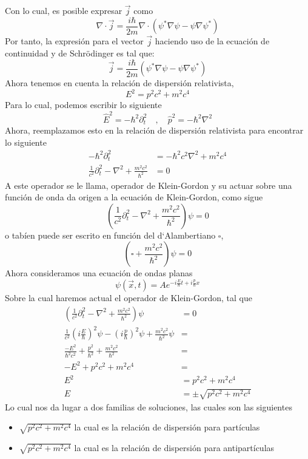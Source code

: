 \documentclass[../main_ej.tex]{subfiles}
\begin{document}
Con lo cual, es posible expresar $\vec{j}$ como 
\begin{equation*}
  \nabla \cdot \vec{j} = \frac{i\hbar}{2m} \nabla \cdot \left( \psi^*\nabla \psi - \psi \nabla \psi^* \right)
\end{equation*}
Por tanto, la expresión para el vector $\vec{j}$ haciendo uso de la ecuación de continuidad y de Schrödinger es tal que:
\begin{equation}
  \vec{j} = \frac{i\hbar}{2m}\left( \psi^*\nabla \psi - \psi\nabla \psi^* \right)
\end{equation}
Ahora tenemos en cuenta la relación de dispersión relativista, 
\begin{equation}
  E^2=p^2c^2+m^2c^4
\end{equation}
Para lo cual, podemos escribir lo siguiente
\begin{equation*}
  \hat{E}^2 = -\hbar^2\partial^2_t \quad , \quad \hat{p}^2 = -\hbar^2\nabla^2
\end{equation*}
Ahora, reemplazamos esto en la relación de dispersión relativista para encontrar lo siguiente
\begin{align*}
  -\hbar^2\partial^2_t & = -\hbar^2c^2\nabla^2 + m^2c^4 \\
  \frac{1}{c^2}\partial^2_t-\nabla^2 + \frac{m^2c^2}{\hbar^2} & = 0
\end{align*}
A este operador se le llama, operador de Klein-Gordon y su actuar sobre una función de onda da origen a la ecuación de Klein-Gordon, como sigue
\begin{equation}
  \left(\frac{1}{c^2}\partial^2_t-\nabla^2+\frac{m^2c^2}{\hbar^2}\right)\psi = 0
\end{equation}
o tabíen puede ser escrito en función del d`Alambertiano $\square$,
\begin{equation}
  \left(\square + \frac{m^2c^2}{\hbar^2}\right)\psi = 0
\end{equation}
Ahora consideramos una ecuación de ondas planas
\begin{equation*}
  \psi(\vec{x},t)=Ae^{-i\frac{E}{\hbar}t+i\frac{p}{\hbar}x}
\end{equation*}
Sobre la cual haremos actual el operador de Klein-Gordon, tal que
\begin{align*}
  \left(\frac{1}{c^2}\partial^2_t-\nabla^2+\frac{m^2c^2}{\hbar^2}\right)\psi  & = 0 \\
  \frac{1}{c^2}\left(i\frac{E}{\hbar}\right)^2\psi - \left(i\frac{p}{\hbar}\right)^2\psi + \frac{m^2c^2}{\hbar^2} \psi &  =  \\
  \frac{-E^2}{\hbar^2c^2} + \frac{p^2}{\hbar^2} + \frac{m^2c^2}{\hbar^2} & =  \\
  -E^2 + p^2c^2 + m^2c^4 & = \\
  E^2 & = p^2c^2 +  m^2c^4 \\
  E & = \pm \sqrt{p^2c^2 + m^2c^4}
\end{align*}
Lo cual nos da lugar a dos familias de soluciones, las cuales son las siguientes
\begin{itemize}
  \item $\sqrt{p^2c^2+m^2c^4}$ la cual es la relación de dispersión para partículas
  \item $\sqrt{p^2c^2+m^2c^4}$ la cual es la relación de dispersión para antipartículas 
\end{itemize}
\end{document}
